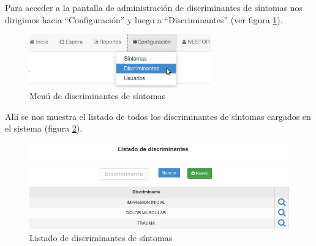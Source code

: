 \label{ABM_discriminantes}
Para acceder a la pantalla de administración de discriminantes de síntomas nos dirigimos hacia ``Configuración'' y luego a ``Discriminantes'' (ver figura \ref{fig:menu_discriminantes}).
\begin{figure}
\centerline{\includegraphics[width=0.7\textwidth]{menu_discriminantes.png}}
\caption{Menú de discriminantes de síntomas}
\label{fig:menu_discriminantes}
\end{figure}
Allí se nos muestra el listado de todos los discriminantes de síntomas cargados en el sistema (figura \ref{fig:listado_discriminantes}).
\begin{figure}
\centerline{\includegraphics[width=1\textwidth]{listado_discriminantes.png}}
\caption{Listado de discriminantes de síntomas}
\label{fig:listado_discriminantes}
\end{figure}

